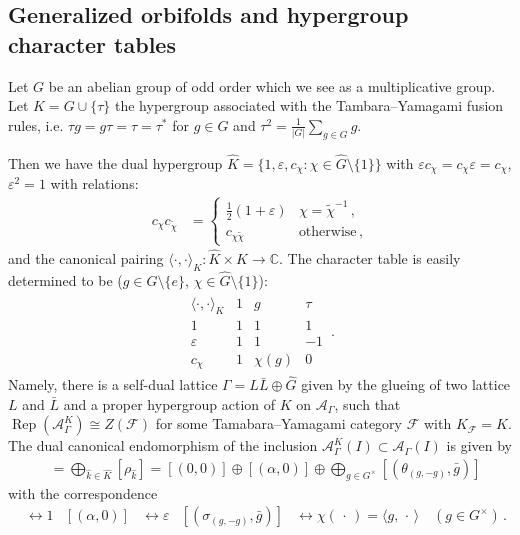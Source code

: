 \documentclass[twoside,11pt,reqno]{amsart}
\makeatletter
\theoremstyle{definition}
\theoremstyle{remark}
\newcommand{\slot}{{~\cdot~}}
\newcommand{\cF}{\mathcal{F}}
\newcommand{\A}{\mathcal{A}}
\newcommand{\CC}{\mathbb{C}}
\DeclareMathOperator{\Rep}{Rep}
\DeclareRobustCommand{\ie}{i.e.\@\xspace}
\newcommand{\bi}[2]{\langle #1,#2\rangle}
\renewcommand{\slot}{\,\cdot\,}
\newcommand{\bislotslot}{\bi\cdot\cdot}
\makeatother
\begin{document}
\subsection{Generalized orbifolds and hypergroup character tables}
\label{ssec:GeneralizedOrbifoldsAndCharacterTables}
Let $G$ be an abelian group of odd order which we see as a multiplicative group. Let $K=G\cup \{\tau\}$ the hypergroup associated with the 
Tambara--Yamagami fusion rules, \ie 
$\tau g=g\tau=\tau=\tau^{\ast}$ for $g\in G$ and 
$\tau^2=\frac{1}{|G|} \sum_{g\in G} g$.

Then we have the dual hypergroup 
$\hat K=\{1,\varepsilon, c_\chi:\chi\in \hat G\setminus\{1\}\}$ with 
$\varepsilon c_\chi=c_\chi\varepsilon =c_\chi$, $\varepsilon^2=1$ with 
relations:
\begin{align}
  c_\chi c_{\tilde\chi}&=
  \begin{cases} 
    \frac12(1+\varepsilon) &\chi=\tilde\chi^{-1}\,,\\
    c_{\chi\tilde\chi} & \text{otherwise}\,,
  \end{cases}
\end{align}
and the canonical pairing $\bislotslot_K\colon \hat K\times  K \to \CC$.
The character table is easily determined to be ($g\in G\setminus\{e\}$,
$\chi\in \hat G\setminus\{1\}$):
\begin{align}
  \label{eq:CharacterTable}
  \begin{array}{l|lll}
    \bislotslot_K &1 & g &\tau\\
    \hline
    1 & 1 & 1& 1\\
    \varepsilon & 1 &1 & -1\\
    c_\chi &1 & \chi(g)& 0
  \end{array}\,.
\end{align}
Namely, there is a self-dual lattice $\Gamma=L\bar L\oplus \hat G$ given by 
the glueing of two lattice $L$ and $\bar L$ and a proper hypergroup action of
$K$ on $\A_\Gamma$, such that $\Rep(\A_\Gamma^K)\cong Z(\cF)$ for some 
Tamabara--Yamagami category $\cF$ with $K_\cF=K$. 
The dual canonical endomorphism of the inclusion 
$\A_\Gamma^K(I)\subset \A_\Gamma(I)$ is given by
\begin{align}
  [\theta]&=\bigoplus_{\hat k\in \hat K}[\rho_{\hat k}]=
    [(0,0)]\oplus[(\alpha,0)]\oplus
    \bigoplus_{g\in G^\times}[(\theta_{(g,-g)},\bar g)]
\end{align}
with the correspondence 
\begin{align}
  [(0,0)] &\leftrightarrow 1&
  [(\alpha,0)] &\leftrightarrow \varepsilon&
  [(\sigma_{(g,-g)},\bar g)]&\leftrightarrow \chi(\slot)
    =\bi{g}{\slot} \quad (g\in G^\times)\,.
\end{align}
\end{document}
